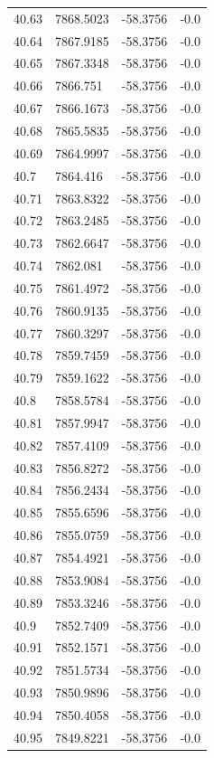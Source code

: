 \begin{table}[H]
\begin{tabular}{llll}
40.63 & 7868.5023 & -58.3756 & -0.0 \\
40.64 & 7867.9185 & -58.3756 & -0.0 \\
40.65 & 7867.3348 & -58.3756 & -0.0 \\
40.66 & 7866.751 & -58.3756 & -0.0 \\
40.67 & 7866.1673 & -58.3756 & -0.0 \\
40.68 & 7865.5835 & -58.3756 & -0.0 \\
40.69 & 7864.9997 & -58.3756 & -0.0 \\
40.7 & 7864.416 & -58.3756 & -0.0 \\
40.71 & 7863.8322 & -58.3756 & -0.0 \\
40.72 & 7863.2485 & -58.3756 & -0.0 \\
40.73 & 7862.6647 & -58.3756 & -0.0 \\
40.74 & 7862.081 & -58.3756 & -0.0 \\
40.75 & 7861.4972 & -58.3756 & -0.0 \\
40.76 & 7860.9135 & -58.3756 & -0.0 \\
40.77 & 7860.3297 & -58.3756 & -0.0 \\
40.78 & 7859.7459 & -58.3756 & -0.0 \\
40.79 & 7859.1622 & -58.3756 & -0.0 \\
40.8 & 7858.5784 & -58.3756 & -0.0 \\
40.81 & 7857.9947 & -58.3756 & -0.0 \\
40.82 & 7857.4109 & -58.3756 & -0.0 \\
40.83 & 7856.8272 & -58.3756 & -0.0 \\
40.84 & 7856.2434 & -58.3756 & -0.0 \\
40.85 & 7855.6596 & -58.3756 & -0.0 \\
40.86 & 7855.0759 & -58.3756 & -0.0 \\
40.87 & 7854.4921 & -58.3756 & -0.0 \\
40.88 & 7853.9084 & -58.3756 & -0.0 \\
40.89 & 7853.3246 & -58.3756 & -0.0 \\
40.9 & 7852.7409 & -58.3756 & -0.0 \\
40.91 & 7852.1571 & -58.3756 & -0.0 \\
40.92 & 7851.5734 & -58.3756 & -0.0 \\
40.93 & 7850.9896 & -58.3756 & -0.0 \\
40.94 & 7850.4058 & -58.3756 & -0.0 \\
40.95 & 7849.8221 & -58.3756 & -0.0 \\

\end{tabular}
\end{table}
